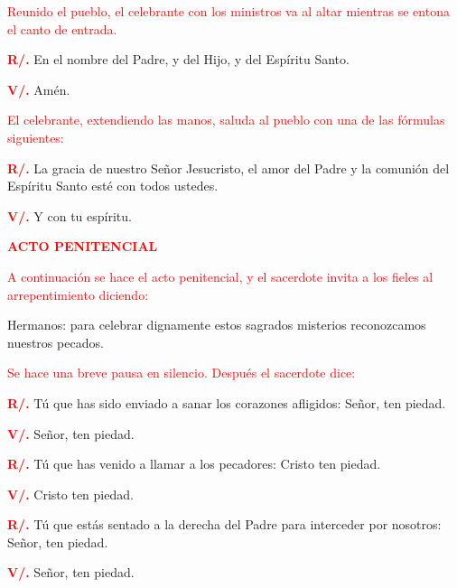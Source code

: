 \documentclass[12pt, letterpaper]{report}
\begin{document}
\large {\textcolor{red}{Reunido el pueblo, el celebrante con los ministros va al altar mientras se entona el canto de entrada.}}

\Large {\bfseries \textcolor{red}{R/.}} \hspace{1cm} {En el nombre del Padre, y del Hijo, y del Esp\'iritu Santo.}

\Large{{\bfseries \textcolor{red}{V/.}} \hspace{1cm} Am\'en.}

\large {\textcolor{red}{El celebrante, extendiendo las manos, saluda al pueblo con una de las f\'ormulas siguientes:}}

\Large {\bfseries \textcolor{red}{R/.}} \hspace{1cm} La gracia de nuestro Se\~nor Jesucristo, el amor del Padre y la comuni\'on del Esp\'iritu Santo est\'e con todos ustedes.

{\bfseries \textcolor{red}{V/.}} \hspace{1cm} \Large Y con tu esp\'iritu.

\large {\bfseries \textcolor{red}{ACTO PENITENCIAL}}

\large {\textcolor{red}{A continuaci\'on se hace el acto penitencial, y el sacerdote invita a los fieles al arrepentimiento
diciendo:}}

\noindent
\Large {Hermanos: para celebrar dignamente estos sagrados misterios reconozcamos nuestros pecados.}

\large {\textcolor{red}{Se hace una breve pausa en silencio. Despu\'es el sacerdote dice:}}

\Large {\bfseries \textcolor{red}{R/.}} \hspace{1cm} T\'u que has sido enviado a sanar los corazones afligidos: Se\~nor, ten piedad.

\Large {\bfseries \textcolor{red}{V/.}} \hspace{1cm} Se\~nor, ten piedad. 

\Large {\bfseries \textcolor{red}{R/.}} \hspace{1cm} T\'u que has venido a llamar a los pecadores: Cristo ten piedad.

\Large {\bfseries \textcolor{red}{V/.}} \hspace{1cm} Cristo ten piedad.

\Large {\bfseries \textcolor{red}{R/.}} \hspace{1cm} T\'u que est\'as sentado a la derecha del Padre para interceder por nosotros: Se\~nor, ten piedad.

{\bfseries \textcolor{red}{V/.}} \hspace{1cm} Se\~nor, ten piedad. 
\end{document}
